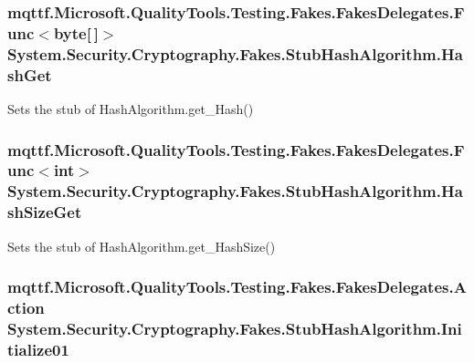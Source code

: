 \hypertarget{class_system_1_1_security_1_1_cryptography_1_1_fakes_1_1_stub_hash_algorithm_af9a2ad54496af8d14e041b36f3fc132f}{
\subsubsection[{Hash\-Get}]{\setlength{\rightskip}{0pt plus 5cm}mqttf.\-Microsoft.\-Quality\-Tools.\-Testing.\-Fakes.\-Fakes\-Delegates.\-Func$<$byte\mbox{[}$\,$\mbox{]}$>$ System.\-Security.\-Cryptography.\-Fakes.\-Stub\-Hash\-Algorithm.\-Hash\-Get}}\label{class_system_1_1_security_1_1_cryptography_1_1_fakes_1_1_stub_hash_algorithm_af9a2ad54496af8d14e041b36f3fc132f}


Sets the stub of Hash\-Algorithm.\-get\-\_\-\-Hash()

\hypertarget{class_system_1_1_security_1_1_cryptography_1_1_fakes_1_1_stub_hash_algorithm_aeaf5652fdcbeb76b786dd7375402f801}{
\subsubsection[{Hash\-Size\-Get}]{\setlength{\rightskip}{0pt plus 5cm}mqttf.\-Microsoft.\-Quality\-Tools.\-Testing.\-Fakes.\-Fakes\-Delegates.\-Func$<$int$>$ System.\-Security.\-Cryptography.\-Fakes.\-Stub\-Hash\-Algorithm.\-Hash\-Size\-Get}}\label{class_system_1_1_security_1_1_cryptography_1_1_fakes_1_1_stub_hash_algorithm_aeaf5652fdcbeb76b786dd7375402f801}


Sets the stub of Hash\-Algorithm.\-get\-\_\-\-Hash\-Size()

\hypertarget{class_system_1_1_security_1_1_cryptography_1_1_fakes_1_1_stub_hash_algorithm_a4a8d9540c323e12811ed283331eaa970}{
\subsubsection[{Initialize01}]{\setlength{\rightskip}{0pt plus 5cm}mqttf.\-Microsoft.\-Quality\-Tools.\-Testing.\-Fakes.\-Fakes\-Delegates.\-Action System.\-Security.\-Cryptography.\-Fakes.\-Stub\-Hash\-Algorithm.\-Initialize01}}\label{class_system_1_1_security_1_1_cryptography_1_1_fakes_1_1_stub_hash_algorithm_a4a8d9540c323e12811ed283331eaa970}


